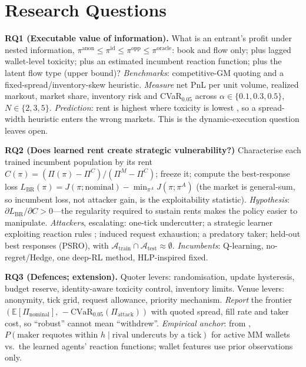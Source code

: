 \documentclass[11pt]{article}
\begin{document}
\section{Research Questions}
\textbf{RQ1 (Executable value of information).} What is an entrant's profit under nested information, $\pi^{\text{anon}}\le\pi^{\text{id}}\le\pi^{\text{opp}}\le\pi^{\text{oracle}}$: book and flow only; plus lagged wallet-level toxicity; plus an estimated incumbent reaction function; plus the latent flow type (upper bound)? \emph{Benchmarks}: competitive-GM quoting and a fixed-spread/inventory-skew heuristic. \emph{Measure} net PnL per unit volume, realized markout, market share, inventory risk and CVaR$_{0.05}$ across $\alpha\in\{0.1,0.3,0.5\}$, $N\in\{2,3,5\}$. \emph{Prediction}: rent is highest where toxicity is lowest \cite{cfl}, so a spread-width heuristic enters the wrong markets. This is the dynamic-execution question \cite{zhai} leaves open.

\textbf{RQ2 (Does learned rent create strategic vulnerability?)} Characterise each trained incumbent population by its rent $C(\pi)=(\Pi(\pi)-\Pi^C)/(\Pi^M-\Pi^C)$; freeze it; compute the best-response loss $L_{\text{BR}}(\pi)=J(\pi;\text{nominal})-\min_{\pi^A}J(\pi;\pi^A)$ (the market is general-sum, so incumbent loss, not attacker gain, is the exploitability statistic). \emph{Hypothesis}: $\partial L_{\text{BR}}/\partial C>0$---the regularity required to sustain rents makes the policy easier to manipulate. \emph{Attackers}, escalating: one-tick undercutter; a strategic learner exploiting reaction rules \cite{dss}; induced request exhaustion; a predatory taker; held-out best responses (PSRO), with $\mathcal{A}_{\text{train}}\cap\mathcal{A}_{\text{test}}\approx\emptyset$. \emph{Incumbents}: Q-learning, no-regret/Hedge, one deep-RL method, HLP-inspired fixed.

\textbf{RQ3 (Defences; extension).} Quoter levers: randomisation, update hysteresis, budget reserve, identity-aware toxicity control, inventory limits. Venue levers: anonymity, tick grid, request allowance, priority mechanism. \emph{Report} the frontier $(\mathbb{E}[\Pi_{\text{nominal}}],\,-\text{CVaR}_{0.05}(\Pi_{\text{attack}}))$ with quoted spread, fill rate and taker cost, so ``robust'' cannot mean ``withdrew''. \emph{Empirical anchor}: from \cite{albers}, $P(\text{maker requotes within } h \mid \text{rival undercuts by a tick})$ for active MM wallets vs.\ the learned agents' reaction functions; wallet features use prior observations only.
\end{document}
